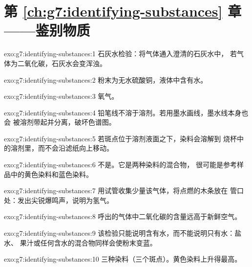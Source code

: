 \section*{第 \ref{ch:g7:identifying-substances} 章——鉴别物质}

\begin{solution}{exo:g7:identifying-substances:1}
石灰水检验：将气体通入澄清的石灰水中，
若气体为二氧化碳，石灰水会变浑浊。
\end{solution}

\begin{solution}{exo:g7:identifying-substances:2}
粉末为无水硫酸铜，液体中含有水。
\end{solution}

\begin{solution}{exo:g7:identifying-substances:3}
氧气。
\end{solution}

\begin{solution}{exo:g7:identifying-substances:4}
铅笔线不溶于溶剂。若用墨水画线，墨水线本身也会
被溶剂带起并分离，破坏色谱图。
\end{solution}

\begin{solution}{exo:g7:identifying-substances:5}
若斑点位于溶剂液面之下，染料会溶解到
烧杯中的溶剂里，而不会沿滤纸向上移动。
\end{solution}

\begin{solution}{exo:g7:identifying-substances:6}
不是。它是两种染料的混合物，
很可能是参考样品中的黄色染料和蓝色染料。
\end{solution}

\begin{solution}{exo:g7:identifying-substances:7}
用试管收集少量该气体，将点燃的木条放在
管口处：发出尖锐爆鸣声，说明为氢气。
\end{solution}

\begin{solution}{exo:g7:identifying-substances:8}
呼出的气体中二氧化碳的含量远高于新鲜空气。
\end{solution}

\begin{solution}{exo:g7:identifying-substances:9}
该检验只能说明含有水，而不能说明只有水：盐水、
果汁或任何含水的混合物同样会使粉末变蓝。
\end{solution}

\begin{solution}{exo:g7:identifying-substances:10}
三种染料（三个斑点）。黄色染料上升得最高。
\end{solution}

